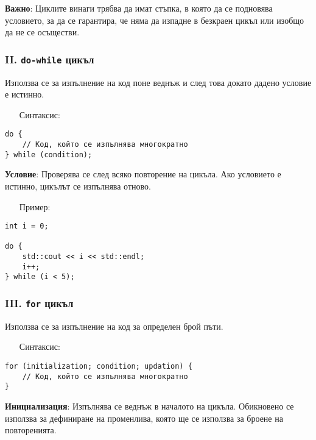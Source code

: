 \documentclass[oneside]{book}
\newcommand*{\code}[1]{\texttt{#1}}
\begin{document}
\textbf{Важно}: Циклите винаги трябва да имат стъпка, в която да се подновява условието, за да се гарантира, че няма да изпадне в безкраен цикъл или изобщо да не се осъществи.

\subsubsection{II. \code{do-while} цикъл}
Използва се за изпълнение на код поне веднъж и след това докато дадено условие е истинно.

\begin{itemize}\item[Синтаксис:]\end{itemize}
\begin{mdframed}\begin{lstlisting}
do {
    // Код, който се изпълнява многократно
} while (condition);
\end{lstlisting}\end{mdframed}

\textbf{Условие}: Проверява се след всяко повторение на цикъла. Ако условието е истинно, цикълът се изпълнява отново.

\begin{itemize}\item[Пример:]\end{itemize}
\begin{mdframed}\begin{lstlisting}
int i = 0;

do {
    std::cout << i << std::endl;
    i++;
} while (i < 5);
\end{lstlisting}\end{mdframed}

\subsubsection{III. \code{for} цикъл}
Използва се за изпълнение на код за определен брой пъти.

\begin{itemize}\item[Синтаксис:]\end{itemize}
\begin{mdframed}\begin{lstlisting}
for (initialization; condition; updation) {
    // Код, който се изпълнява многократно
}
\end{lstlisting}\end{mdframed}

\textbf{Инициализация}: Изпълнява се веднъж в началото на цикъла. Обикновено се използва за дефиниране на променлива, която ще се използва за броене на повторенията.
\end{document}
